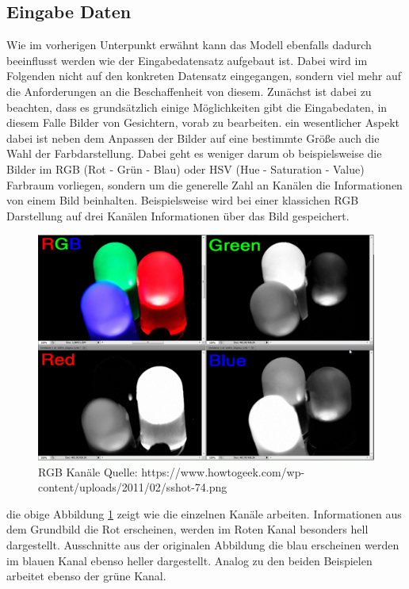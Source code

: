 \documentclass[12pt, a4paper]{scrbook}
\begin{document}
\subsection{Eingabe Daten}
\label{subsec: Eingabe Daten}
Wie im vorherigen Unterpunkt erwähnt kann das Modell ebenfalls dadurch beeinflusst werden wie der Eingabedatensatz aufgebaut ist. Dabei wird im Folgenden nicht auf den konkreten Datensatz eingegangen, sondern viel mehr auf die Anforderungen an die Beschaffenheit von diesem. Zunächst ist dabei zu beachten, dass es grundsätzlich einige Möglichkeiten gibt die Eingabedaten, in diesem Falle Bilder von Gesichtern, vorab zu bearbeiten. ein wesentlicher Aspekt dabei ist neben dem Anpassen der Bilder auf eine bestimmte Größe auch die Wahl der Farbdarstellung. Dabei geht es weniger darum ob beispielsweise die Bilder im RGB (Rot - Grün - Blau) oder HSV (Hue - Saturation - Value) Farbraum vorliegen, sondern um die generelle Zahl an Kanälen die Informationen von einem Bild beinhalten.
Beispielsweise wird bei einer klassichen RGB Darstellung auf drei Kanälen Informationen über das Bild gespeichert. 
\begin{figure}[h]
\includegraphics[width=\linewidth]{Bilder/RGB.png}
\caption{RGB Kanäle \newline Quelle: https://www.howtogeek.com/wp-content/uploads/2011/02/sshot-74.png}
\label{fig: RGB}
\end{figure}
die obige Abbildung \ref{fig: RGB} zeigt wie die einzelnen Kanäle arbeiten. Informationen aus dem Grundbild die Rot erscheinen, werden im Roten Kanal besonders hell dargestellt. 
Ausschnitte aus der originalen Abbildung die blau erscheinen werden im blauen Kanal ebenso heller dargestellt. Analog zu den beiden Beispielen arbeitet ebenso der grüne Kanal.
\end{document}

